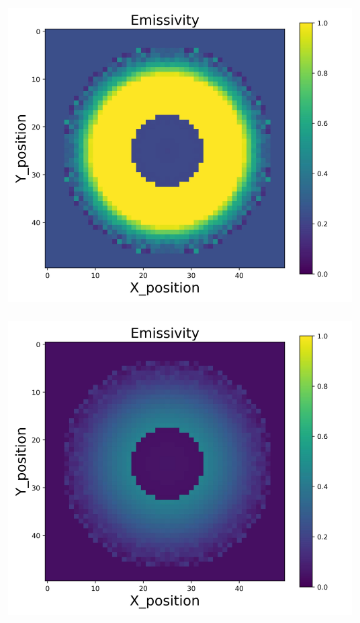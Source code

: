 \begin{figure}[p]
\begin{minipage}{\textwidth}
\begin{subfigure}{0.325\textwidth}
        \end{subfigure}
    \end{minipage}\\
    \begin{minipage}{\textwidth}
        \centering
        \begin{subfigure}{0.325\textwidth}
            \centering
            \includegraphics[width=\textwidth]{figures/raw_data/25/mix/emi_cal.jpg}
        \end{subfigure}
        \begin{subfigure}{0.325\textwidth}
            \centering
            \includegraphics[width=\textwidth]{figures/raw_data/26/mix/emi_cal.jpg}

\end{subfigure}
\end{minipage}
\end{figure}
